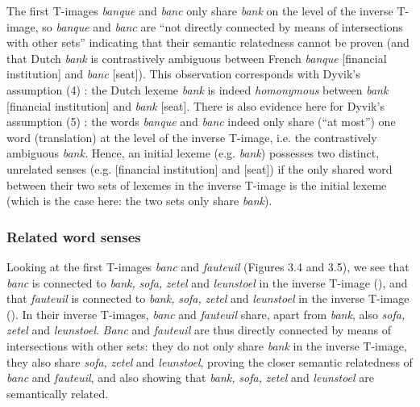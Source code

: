 The first T-images \textit{banque} and \textit{banc} only share \textit{bank} on the level of the inverse T-image, so \textit{banque} and \textit{banc} are “not directly connected by means of intersections with other sets” \citep[32]{langemets_translations_2005} indicating that their semantic relatedness cannot be proven (and that Dutch \textit{bank} is contrastively ambiguous between French \textit{banque} [financial institution] and \textit{banc} [seat]). This observation corresponds with Dyvik’s assumption (4) \citep[31--32]{langemets_translations_2005}: the Dutch lexeme \textit{bank} is indeed \textit{homonymous} between \textit{bank} [financial institution] and \textit{bank} [seat]. There is also evidence here for Dyvik’s assumption (5) \citep[31--32]{langemets_translations_2005}: the words \textit{banque} and \textit{banc} indeed only share (“at most”) one word (translation) at the level of the inverse T-image, i.e. the contrastively ambiguous \textit{bank.} Hence, an initial lexeme (e.g. \textit{bank}) possesses two distinct, unrelated senses (e.g. [financial institution] and [seat]) if the only shared word between their two sets of lexemes in the inverse T-image is the initial lexeme (which is the case here: the two sets only share \textit{bank}).

\subsubsection{Related word senses}
\label{sec:3.4.3.2}
Looking at the first T-images \textit{banc} and \textit{fauteuil} (Figures 3.4 and 3.5), we see that \textit{banc} is connected to \textit{bank,} \textit{sofa,} \textit{zetel} and \textit{leunstoel} in the inverse T-image (), and that \textit{fauteuil} is connected to \textit{bank,} \textit{sofa,} \textit{zetel} and \textit{leunstoel} in the inverse T-image (). In their inverse T-images, \textit{banc} and \textit{fauteuil} share, apart from \textit{bank}, also \textit{sofa,} \textit{zetel} and \textit{leunstoel}. \textit{Banc} and \textit{fauteuil} are thus directly connected by means of intersections with other sets: they do not only share \textit{bank} in the inverse T-image, they also share \textit{sofa,} \textit{zetel} and \textit{leunstoel}, proving the closer semantic relatedness of \textit{banc} and \textit{fauteuil}, and also showing that \textit{bank,} \textit{sofa,} \textit{zetel} and \textit{leunstoel} are semantically related.

